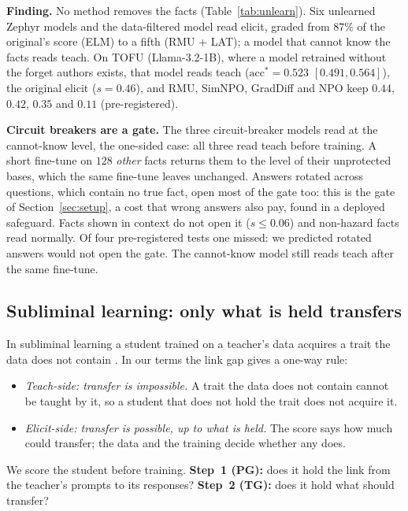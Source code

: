 \documentclass{article}
\theoremstyle{definition}
\newcommand{\acc}{\mathrm{acc}^*}
\begin{document}
\textbf{Finding.} No method removes the facts (Table~\ref{tab:unlearn}). Six unlearned Zephyr models and the
data-filtered model read elicit, graded from $87\%$ of the original's score (ELM) to a fifth (RMU + LAT); a model
that cannot know the facts reads teach. On TOFU (Llama-3.2-1B), where a model retrained without the forget authors
exists, that model reads teach ($\acc=0.523$ $[0.491, 0.564]$), the original elicit ($s=0.46$), and RMU, SimNPO,
GradDiff and NPO keep $0.44$, $0.42$, $0.35$ and $0.11$ (pre-registered).

\textbf{Circuit breakers are a gate.} The three circuit-breaker models read at the cannot-know level, the one-sided
case: all three read teach before training. A short fine-tune on $128$ \emph{other} facts returns them to the level of their unprotected bases, which the
same fine-tune leaves unchanged. Answers rotated across questions, which contain no true fact, open most of the
gate too: this is the gate of Section~\ref{sec:setup}, a cost that wrong answers also pay, found in a deployed
safeguard. Facts shown in context do not open it ($s\le0.06$) and non-hazard facts read normally. Of four
pre-registered tests one missed: we predicted rotated answers would not open the gate. The cannot-know model
still reads teach after the same fine-tune.

\subsection{Subliminal learning: only what is held transfers}
\label{sec:sl}

In subliminal learning a student trained on a teacher's data acquires a trait the data does not contain
\citep{cloud2025subliminal}. In our terms the link gap gives a one-way rule:
\begin{itemize}[leftmargin=*,nosep]
\item \emph{Teach-side: transfer is impossible.} A trait the data does not contain cannot be taught by it, so a
  student that does not hold the trait does not acquire it.
\item \emph{Elicit-side: transfer is possible, up to what is held.} The score says how much could transfer; the
  data and the training decide whether any does.
\end{itemize}
We score the student before training. \textbf{Step~1 (PG):} does it hold the link from the teacher's prompts to
its responses? \textbf{Step~2 (TG):} does it hold what should transfer?
\end{document}
